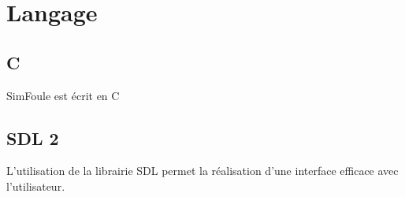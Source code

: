 %
\section{Langage}
%
%
\label{claude1}\label{tony1}
\subsection{C}
%
SimFoule est écrit en C \cite{delannoy} \cite{zhang}
%
\subsection{SDL 2}
%
L'utilisation de la librairie SDL permet la réalisation d'une interface efficace avec l'utilisateur.
%
%
